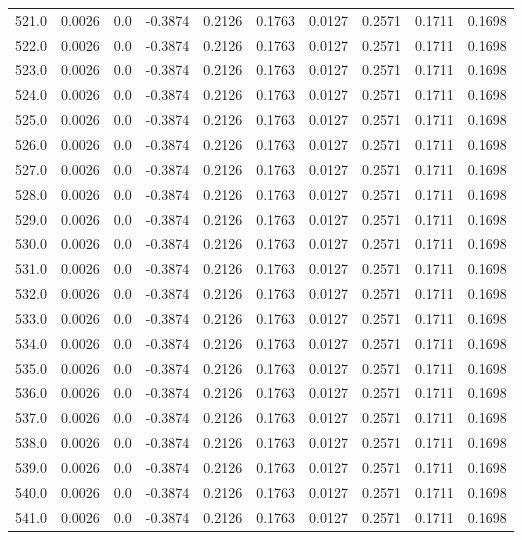 \begin{longtable}{lrrrrrrrrr}
521.0 & 0.0026 & 0.0 & -0.3874 & 0.2126 & 0.1763 & 0.0127 & 0.2571 & 0.1711 & 0.1698 \\
522.0 & 0.0026 & 0.0 & -0.3874 & 0.2126 & 0.1763 & 0.0127 & 0.2571 & 0.1711 & 0.1698 \\
523.0 & 0.0026 & 0.0 & -0.3874 & 0.2126 & 0.1763 & 0.0127 & 0.2571 & 0.1711 & 0.1698 \\
524.0 & 0.0026 & 0.0 & -0.3874 & 0.2126 & 0.1763 & 0.0127 & 0.2571 & 0.1711 & 0.1698 \\
525.0 & 0.0026 & 0.0 & -0.3874 & 0.2126 & 0.1763 & 0.0127 & 0.2571 & 0.1711 & 0.1698 \\
526.0 & 0.0026 & 0.0 & -0.3874 & 0.2126 & 0.1763 & 0.0127 & 0.2571 & 0.1711 & 0.1698 \\
527.0 & 0.0026 & 0.0 & -0.3874 & 0.2126 & 0.1763 & 0.0127 & 0.2571 & 0.1711 & 0.1698 \\
528.0 & 0.0026 & 0.0 & -0.3874 & 0.2126 & 0.1763 & 0.0127 & 0.2571 & 0.1711 & 0.1698 \\
529.0 & 0.0026 & 0.0 & -0.3874 & 0.2126 & 0.1763 & 0.0127 & 0.2571 & 0.1711 & 0.1698 \\
530.0 & 0.0026 & 0.0 & -0.3874 & 0.2126 & 0.1763 & 0.0127 & 0.2571 & 0.1711 & 0.1698 \\
531.0 & 0.0026 & 0.0 & -0.3874 & 0.2126 & 0.1763 & 0.0127 & 0.2571 & 0.1711 & 0.1698 \\
532.0 & 0.0026 & 0.0 & -0.3874 & 0.2126 & 0.1763 & 0.0127 & 0.2571 & 0.1711 & 0.1698 \\
533.0 & 0.0026 & 0.0 & -0.3874 & 0.2126 & 0.1763 & 0.0127 & 0.2571 & 0.1711 & 0.1698 \\
534.0 & 0.0026 & 0.0 & -0.3874 & 0.2126 & 0.1763 & 0.0127 & 0.2571 & 0.1711 & 0.1698 \\
535.0 & 0.0026 & 0.0 & -0.3874 & 0.2126 & 0.1763 & 0.0127 & 0.2571 & 0.1711 & 0.1698 \\
536.0 & 0.0026 & 0.0 & -0.3874 & 0.2126 & 0.1763 & 0.0127 & 0.2571 & 0.1711 & 0.1698 \\
537.0 & 0.0026 & 0.0 & -0.3874 & 0.2126 & 0.1763 & 0.0127 & 0.2571 & 0.1711 & 0.1698 \\
538.0 & 0.0026 & 0.0 & -0.3874 & 0.2126 & 0.1763 & 0.0127 & 0.2571 & 0.1711 & 0.1698 \\
539.0 & 0.0026 & 0.0 & -0.3874 & 0.2126 & 0.1763 & 0.0127 & 0.2571 & 0.1711 & 0.1698 \\
540.0 & 0.0026 & 0.0 & -0.3874 & 0.2126 & 0.1763 & 0.0127 & 0.2571 & 0.1711 & 0.1698 \\
541.0 & 0.0026 & 0.0 & -0.3874 & 0.2126 & 0.1763 & 0.0127 & 0.2571 & 0.1711 & 0.1698 \\

\end{longtable}
